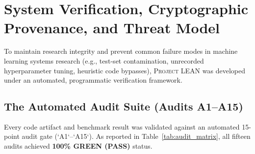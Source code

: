\documentclass[10pt,twocolumn,letterpaper]{article}
\newcommand{\systemname}{\textsc{Project LEAN}}
\begin{document}
\section{System Verification, Cryptographic Provenance, and Threat Model}
\label{sec:audit}

To maintain research integrity and prevent common failure modes in machine learning systems research (e.g., test-set contamination, unrecorded hyperparameter tuning, heuristic code bypasses), \systemname{} was developed under an automated, programmatic verification framework.

\subsection{The Automated Audit Suite (Audits A1–A15)}
Every code artifact and benchmark result was validated against an automated 15-point audit gate (`A1`–`A15`). As reported in Table~\ref{tab:audit_matrix}, all fifteen audits achieved \textbf{100\% GREEN (PASS)} status.
\end{document}
